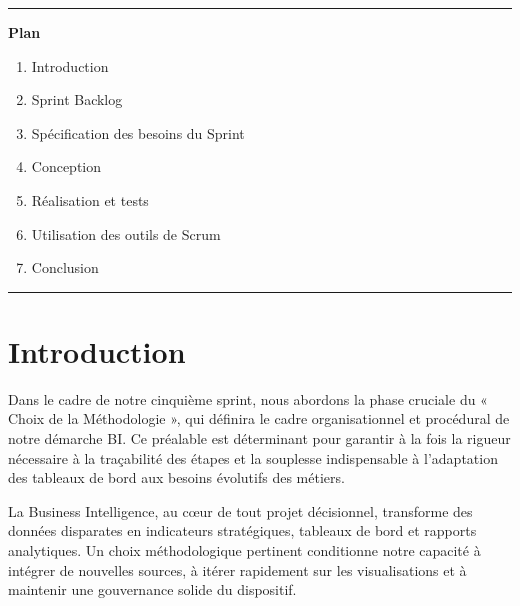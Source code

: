\documentclass[a4paper,11pt]{report}
\begin{document}
\vspace{1.5cm}
\begin{center}
  \color{blue!60!black}\rule{0.6\textwidth}{1pt}
\end{center}
\vspace{1.5cm}

\begin{center}
  {\huge\bfseries Plan}\\[0.5em]
\end{center}
\vspace{1em}

\begin{enumerate}[%
  label=\bfseries\Large\arabic*., 
  leftmargin=2cm, 
  itemsep=1em
]
  \item Introduction
  \item Sprint Backlog
  \item Spécification des besoins du Sprint
  \item Conception
  \item Réalisation et tests
  \item Utilisation des outils de Scrum
  \item Conclusion
\end{enumerate}

\vfill
\begin{center}
  \color{blue!60!black}\rule{0.6\textwidth}{0.8pt}
\end{center}

\vspace{1em}
\section*{Introduction}

Dans le cadre de notre cinquième sprint, nous abordons la phase cruciale du « Choix de la Méthodologie », qui définira le cadre organisationnel et procédural de notre démarche BI. Ce préalable est déterminant pour garantir à la fois la rigueur nécessaire à la traçabilité des étapes et la souplesse indispensable à l’adaptation des tableaux de bord aux besoins évolutifs des métiers.  

La Business Intelligence, au cœur de tout projet décisionnel, transforme des données disparates en indicateurs stratégiques, tableaux de bord et rapports analytiques. Un choix méthodologique pertinent conditionne notre capacité à intégrer de nouvelles sources, à itérer rapidement sur les visualisations et à maintenir une gouvernance solide du dispositif.  
\end{document}
